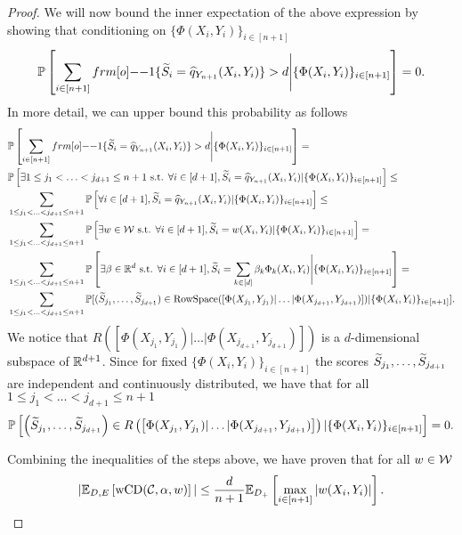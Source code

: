 \begin{proof}
     We will now bound the inner expectation of the above expression by showing that conditioning on $\{\Phi(X_i,Y_i)\}_{i \in [n+1]}$
     \[
     \PP \left[ \sum_{i \in [n+1] } \11\{\tS_i = \hat{q}_{Y_{n+1}}(X_i,Y_i)\} > d \Bigg| \{\Phi(X_i,Y_i)\}_{i \in [n+1]}\right] =0.
     \] 
    In more detail, we can upper bound this probability as follows
    \begin{align*}
        &\PP \left[ \sum_{i \in [n+1] } \11\{\tS_i = \hat{q}_{Y_{n+1}}(X_i,Y_i)\} > d \Bigg| \{\Phi(X_i,Y_i)\}_{i \in [n+1]}\right] =\\
        & \PP \left[ \exists 1 \leq j_1 < \ldots < j_{d+1} \leq n+1 \text{ s.t. } \forall i \in [d+1], \tS_i = \hat{q}_{Y_{n+1}}(X_i,Y_i)  | \{\Phi(X_i,Y_i)\}_{i \in [n+1]} \right] \leq\\
        & \sum_{1 \leq j_1 < \ldots < j_{d+1} \leq n+1} \PP \left[\forall i \in [d+1], \tS_i = \hat{q}_{Y_{n+1}}(X_i,Y_i) | \{\Phi(X_i,Y_i)\}_{i \in [n+1]} \right]\leq\\
        & \sum_{1 \leq j_1 < \ldots < j_{d+1} \leq n+1} \PP \left[\exists w \in \calW  \text{ s.t. }\forall i \in [d+1], \tS_i = w(X_i,Y_i)  | \{\Phi(X_i,Y_i)\}_{i \in [n+1]} \right] =\\
        & \sum_{1 \leq j_1 < \ldots < j_{d+1} \leq n+1} \PP \left[\exists \beta \in \RR^d \text{ s.t. } \forall i \in [d+1], \tS_i= \sum_{k \in [d]}\beta_k\Phi_k(X_i,Y_i) \Bigg| \{\Phi(X_i,Y_i)\}_{i \in [n+1]}\right] =\\
        &  \sum_{1 \leq j_1 < \ldots < j_{d+1} \leq n+1} \PP [ (\tS_{j_1}, \ldots, \tS_{j_{d+1}}) \in \text{RowSpace}([\Phi(X_{j_1},Y_{j_1})|\ldots|\Phi(X_{j_{d+1}}, Y_{j_{d+1}})] )| \{\Phi(X_i,Y_i)\}_{i \in [n+1]}].
    \end{align*}
    We notice that $R\left(\left[\Phi(X_{j_1},Y_{j_1})|\ldots|\Phi(X_{j_{d+1}}, Y_{j_{d+1}})\right]\right)$ is a $d$-dimensional subspace of $\mathbb{R}^{d+1}$. Since for fixed $\{\Phi(X_i,Y_i)\}_{i \in [n+1]}$ the scores ${\widetilde{S}}_{j_1}, \ldots, {\widetilde{S}}_{j_{d+1}}$ are independent and continuously distributed, we have that for all $1 \leq j_1 < \ldots < j_{d+1} \leq n+1$
   \[
   \mathbb{P} \left[ \left({\widetilde{S}}_{j_1}, \ldots, {\widetilde{S}}_{j_{d+1}}\right) \in R\left(\left[\Phi(X_{j_1},Y_{j_1})|\ldots|\Phi(X_{j_{d+1}}, Y_{j_{d+1}})\right] \right)| \{\Phi(X_i,Y_i)\}_{i \in [n+1]}\right] = 0.
   \]

     Combining the inequalities of the steps above, we have proven that for all $w \in {\cal W}$
     \[
     |\mathbb{E}_{D,E} \left[ \text{wCD}({\cal C}, \alpha, w)\right] |\leq \frac{d}{n+1} \mathbb{E}_{D_{+}}\left[ \max_{i \in [n+1]}|w(X_i,Y_i)|\right].
     \]
\end{proof}


